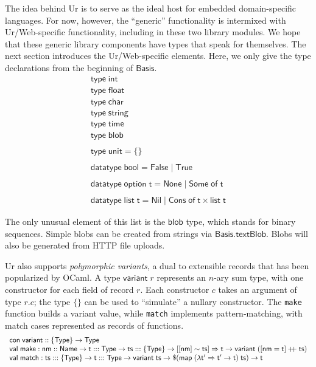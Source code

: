 \documentclass{article}
\newcommand{\cd}[1]{\texttt{#1}}
\newcommand{\mt}[1]{\mathsf{#1}}
\newcommand{\rc}{+ \hspace{-.075in} + \;}
\begin{document}
The idea behind Ur is to serve as the ideal host for embedded domain-specific languages.  For now, however, the ``generic'' functionality is intermixed with Ur/Web-specific functionality, including in these two library modules.  We hope that these generic library components have types that speak for themselves.  The next section introduces the Ur/Web-specific elements.  Here, we only give the type declarations from the beginning of $\mt{Basis}$.
$$\begin{array}{l}
  \mt{type} \; \mt{int} \\
  \mt{type} \; \mt{float} \\
  \mt{type} \; \mt{char} \\
  \mt{type} \; \mt{string} \\
  \mt{type} \; \mt{time} \\
  \mt{type} \; \mt{blob} \\
  \\
  \mt{type} \; \mt{unit} = \{\} \\
  \\
  \mt{datatype} \; \mt{bool} = \mt{False} \mid \mt{True} \\
  \\
  \mt{datatype} \; \mt{option} \; \mt{t} = \mt{None} \mid \mt{Some} \; \mt{of} \; \mt{t} \\
  \\
  \mt{datatype} \; \mt{list} \; \mt{t} = \mt{Nil} \mid \mt{Cons} \; \mt{of} \; \mt{t} \times \mt{list} \; \mt{t}
\end{array}$$

The only unusual element of this list is the $\mt{blob}$ type, which stands for binary sequences.  Simple blobs can be created from strings via $\mt{Basis.textBlob}$.  Blobs will also be generated from HTTP file uploads.

Ur also supports \emph{polymorphic variants}, a dual to extensible records that has been popularized by OCaml.  A type $\mt{variant} \; r$ represents an $n$-ary sum type, with one constructor for each field of record $r$.  Each constructor $c$ takes an argument of type $r.c$; the type $\{\}$ can be used to ``simulate'' a nullary constructor.  The \cd{make} function builds a variant value, while \cd{match} implements pattern-matching, with match cases represented as records of functions.
$$\begin{array}{l}
  \mt{con} \; \mt{variant} :: \{\mt{Type}\} \to \mt{Type} \\
  \mt{val} \; \mt{make} : \mt{nm} :: \mt{Name} \to \mt{t} ::: \mt{Type} \to \mt{ts} ::: \{\mt{Type}\} \to [[\mt{nm}] \sim \mt{ts}] \Rightarrow \mt{t} \to \mt{variant} \; ([\mt{nm} = \mt{t}] \rc \mt{ts}) \\
  \mt{val} \; \mt{match} : \mt{ts} ::: \{\mt{Type}\} \to \mt{t} ::: \mt{Type} \to \mt{variant} \; \mt{ts} \to \$(\mt{map} \; (\lambda \mt{t'} \Rightarrow \mt{t'} \to \mt{t}) \; \mt{ts}) \to \mt{t}
\end{array}$$
\end{document}
